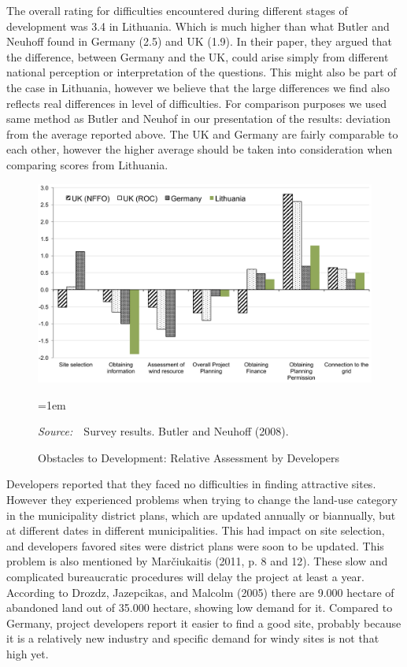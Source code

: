 \documentclass[a4paper, 12pt]{article}
\newcommand{\Figtext}[1]{%
	\begin{tablenotes}[para,flushleft]
		\hangindent=1em
		\footnotesize
		\raggedright
		#1
	\end{tablenotes}
}
\newcommand{\Figsource}[1]{\Figtext{\emph{Source:~}~#1}}
\begin{document}
The overall rating for difficulties encountered during different stages of development was 3.4 in Lithuania. Which is much higher than what Butler and Neuhoff found in Germany (2.5) and UK (1.9). In their paper, they argued that the difference, between Germany and the UK, could arise simply from different national perception or interpretation of the questions. This might also be part of the case in Lithuania, however we believe that the large differences we find also reflects real differences in level of difficulties. For comparison purposes we used same method as Butler and Neuhof in our presentation of the results: deviation from the average reported above. The UK and Germany are fairly comparable to each other, however the higher average should be taken into consideration when comparing scores from Lithuania.

\begin{figure}
	\centering
	\caption{Obstacles to Development: Relative Assessment by Developers}
	\includegraphics[width=1\textwidth]{fig_survey_barriers}
	\Figsource{Survey results. Butler and Neuhoff (2008).}
	\label{fig:fig_survey_barriers}
\end{figure}

Developers reported that they faced no difficulties in finding attractive sites. However they experienced problems when trying to change the land-use category in the municipality district plans, which are updated annually or biannually, but at different dates in different municipalities. This had impact on site selection, and developers favored sites were district plans were soon to be updated. This problem is also mentioned by Marčiukaitis (2011, p. 8 and 12). These slow and complicated bureaucratic procedures will delay the project at least a year. According to Drozdz, Jazepcikas, and Malcolm (2005) there are 9.000 hectare of abandoned land out of 35.000 hectare, showing low demand for it. Compared to Germany, project developers report it easier to find a good site, probably because it is a relatively new industry and specific demand for windy sites is not that high yet.
\end{document}
